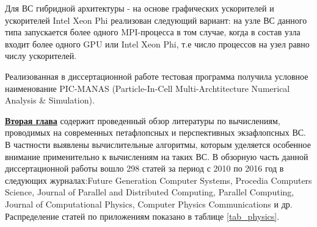 Для ВС гибридной архитектуры - на основе графических ускорителей и ускорителей Intel Xeon Phi реализован следующий вариант: на узле ВС данного типа запускается более одного MPI-процесса в том случае, когда в состав узла входит более одного GPU или Intel Xeon Phi, т.е число процессов на узел равно числу ускорителей.

Реализованная в диссертационной работе тестовая программа получила условное наименование 
PIC-MANAS (Particle-In-Cell Multi-Archtitecture Numerical Analysis & Simulation).



\underline{\textbf{Вторая глава}} содержит проведенный обзор литературы по вычислениям, проводимых на современных петафлопсных и перспективных экзафлопсных ВС. В частности выявлены вычислительные алгоритмы, которым уделяется особенное внимание применительно к вычислениям на таких ВС.
В обзорную часть данной диссертационной работы вошло 298 статей за период с 2010 по 2016 год в следующих журналах:Future Generation Computer Systems, Procedia Computers Science, Journal of Parallel and Distributed Computing, Parallel Computing, Journal of Computational Physics, Computer Physics Communications и др.  Распределение статей по приложениям показано в таблице \ref{tab_physics}.

